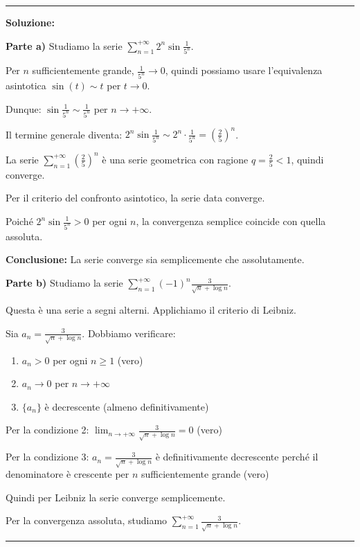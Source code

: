 \documentclass[12pt, a4paper]{article}
\newenvironment{solution}
{\par\noindent\rule{\textwidth}{0.4pt}\par\textbf{Soluzione:}\medskip\par}
{\par\rule{\textwidth}{0.4pt}\par\bigskip}
\begin{document}
\begin{solution}
\textbf{Parte a)} Studiamo la serie $\displaystyle\sum_{n=1}^{+\infty} 2^{n} \sin\frac{1}{5^{n}}$.

Per $n$ sufficientemente grande, $\frac{1}{5^n} \to 0$, quindi possiamo usare l'equivalenza asintotica $\sin(t) \sim t$ per $t \to 0$.

Dunque: $\sin\frac{1}{5^n} \sim \frac{1}{5^n}$ per $n \to +\infty$.

Il termine generale diventa: $2^n \sin\frac{1}{5^n} \sim 2^n \cdot \frac{1}{5^n} = \left(\frac{2}{5}\right)^n$.

La serie $\displaystyle\sum_{n=1}^{+\infty} \left(\frac{2}{5}\right)^n$ è una serie geometrica con ragione $q = \frac{2}{5} < 1$, quindi converge.

Per il criterio del confronto asintotico, la serie data converge.

Poiché $2^n \sin\frac{1}{5^n} > 0$ per ogni $n$, la convergenza semplice coincide con quella assoluta.

\textbf{Conclusione:} La serie converge sia semplicemente che assolutamente.

\vspace{0.5cm}

\textbf{Parte b)} Studiamo la serie $\displaystyle\sum_{n=1}^{+\infty} (-1)^{n} \frac{3}{\sqrt{n} + \log n}$.

Questa è una serie a segni alterni. Applichiamo il criterio di Leibniz.

Sia $a_n = \frac{3}{\sqrt{n} + \log n}$. Dobbiamo verificare:
\begin{enumerate}
    \item $a_n > 0$ per ogni $n \geq 1$ (vero)
    \item $a_n \to 0$ per $n \to +\infty$
    \item $\{a_n\}$ è decrescente (almeno definitivamente)
\end{enumerate}

Per la condizione 2: $\lim_{n \to +\infty} \frac{3}{\sqrt{n} + \log n} = 0$ (vero)

Per la condizione 3: $a_n = \frac{3}{\sqrt{n} + \log n}$ è definitivamente decrescente perché il denominatore è crescente per $n$ sufficientemente grande (vero)

Quindi per Leibniz la serie converge semplicemente.

Per la convergenza assoluta, studiamo $\displaystyle\sum_{n=1}^{+\infty} \frac{3}{\sqrt{n} + \log n}$.


\end{solution}
\end{document}
